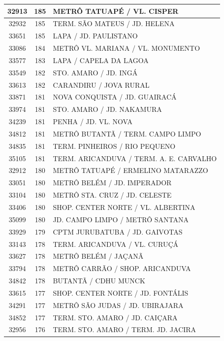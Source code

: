 \documentclass[
	12pt,				%
	oneside,			%
	a4paper,			%
	english,			%
	brazil				%
	]{abntex2ppgsi}
\begin{document}
{{\begin{apendicesenv}
\begin{longtable}{c|c|p{7cm}}
 \hline 
32913 &	185 &	METRÔ TATUAPÉ / VL. CISPER \\ 
 \hline 
32932 &	185 &	TERM. SÃO MATEUS / JD. HELENA \\ 
 \hline 
33651 &	185 &	LAPA / JD. PAULISTANO \\ 
 \hline 
33086 &	184 &	METRÔ VL. MARIANA / VL. MONUMENTO \\ 
 \hline 
33577 &	183 &	LAPA / CAPELA DA LAGOA \\ 
 \hline 
33549 &	182 &	STO. AMARO / JD. INGÁ \\ 
 \hline 
33613 &	182 &	CARANDIRU / JOVA RURAL \\ 
 \hline 
33871 &	181 &	NOVA CONQUISTA / JD. GUAIRACÁ \\ 
 \hline 
33974 &	181 &	STO. AMARO / JD. NAKAMURA \\ 
 \hline 
34239 &	181 &	PENHA / JD. VL. NOVA \\ 
 \hline 
34812 &	181 &	METRÔ BUTANTÃ / TERM. CAMPO LIMPO \\ 
 \hline 
34835 &	181 &	TERM. PINHEIROS / RIO PEQUENO \\ 
 \hline 
35105 &	181 &	TERM. ARICANDUVA / TERM. A. E. CARVALHO \\ 
 \hline 
32912 &	180 &	METRÔ TATUAPÉ / ERMELINO MATARAZZO \\ 
 \hline 
33051 &	180 &	METRÔ BELÉM / JD. IMPERADOR \\ 
 \hline 
33104 &	180 &	METRÔ STA. CRUZ / JD. CELESTE \\ 
 \hline 
33406 &	180 &	SHOP. CENTER NORTE / VL. ALBERTINA \\ 
 \hline 
35099 &	180 &	JD. CAMPO LIMPO / METRÔ SANTANA \\ 
 \hline 
33929 &	179 &	CPTM JURUBATUBA / JD. GAIVOTAS \\ 
 \hline 
33143 &	178 &	TERM. ARICANDUVA / VL. CURUÇÁ \\ 
 \hline 
33627 &	178 &	METRÔ BELÉM / JAÇANÃ \\ 
 \hline 
33794 &	178 &	METRÔ CARRÃO / SHOP. ARICANDUVA \\ 
 \hline 
34842 &	178 &	BUTANTÃ / CDHU MUNCK \\ 
 \hline 
33615 &	177 &	SHOP. CENTER NORTE / JD. FONTÁLIS \\ 
 \hline 
34291 &	177 &	METRÔ SÃO JUDAS / JD. UBIRAJARA \\ 
 \hline 
34852 &	177 &	TERM. STO. AMARO / JD. CAIÇARA \\ 
 \hline 
32956 &	176 &	TERM. STO. AMARO / TERM. JD. JACIRA \\ 
 \hline 

\end{longtable}
\end{apendicesenv}}}
\end{document}

